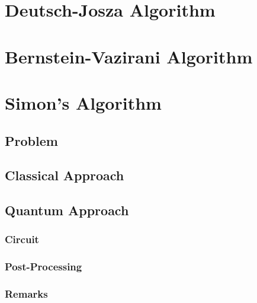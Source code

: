     \section{Deutsch-Josza Algorithm} %

    \section{Bernstein-Vazirani Algorithm} %

    \section{Simon's Algorithm} %

        \subsection{Problem} %

        \subsection{Classical Approach} %

        \subsection{Quantum Approach} %

            \subsubsection{Circuit} %

            \subsubsection{Post-Processing} %

            \subsubsection{Remarks} %

